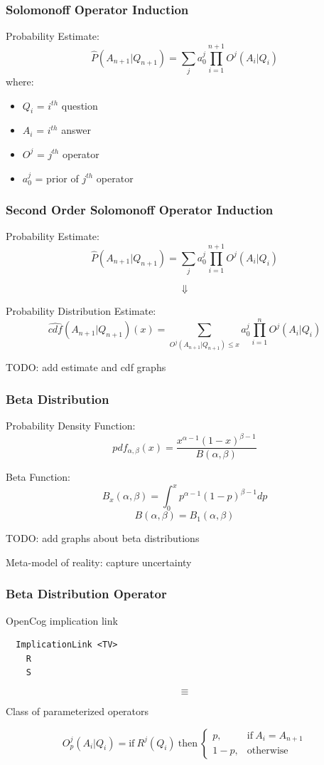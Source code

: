 \documentclass{beamer}
\begin{document}
\begin{frame}
  \frametitle{Solomonoff Operator Induction}

  Probability Estimate:
  $$
  \hat{P}(A_{n+1}|Q_{n+1}) = \sum_j a_0^j \prod_{i=1}^{n+1} O^j(A_i|Q_i)
  $$
  where:
  \begin{itemize}
  \item $Q_i$ = $i^{th}$ question
  \item $A_i$ = $i^{th}$ answer
  \item $O^j$ = $j^{th}$ operator
  \item $a^j_0$ = prior of $j^{th}$ operator
  \end{itemize}
\end{frame}

\begin{frame}
  \frametitle{Second Order Solomonoff Operator Induction}

  Probability Estimate:
  $$
  \hat{P}(A_{n+1}|Q_{n+1}) = \sum_j a_0^j \prod_{i=1}^{n+1} O^j(A_i|Q_i)
  $$

  $$
  \Downarrow
  $$
  
  Probability Distribution Estimate:
  $$
    \hat{cdf}(A_{n+1}|Q_{n+1})(x) = \sum_{O^j(A_{n+1}|Q_{n+1}) \le x}
    a_0^j \prod_{i=1}^{n} O^j(A_i|Q_i)
  $$

  TODO: add estimate and cdf graphs
\end{frame}

\begin{frame}
  \frametitle{Beta Distribution}

  Probability Density Function:
  $$
    pdf_{\alpha, \beta}(x) = \frac{x^{\alpha - 1} (1-x)^{\beta - 1}}
    {B(\alpha, \beta)}
  $$

  Beta Function:
  $$
  B_x(\alpha, \beta) = \int_0^x p^{\alpha - 1}(1-p)^{\beta - 1} dp
  $$
  $$
  B(\alpha, \beta) = B_1(\alpha, \beta)
  $$

  TODO: add graphs about beta distributions

  Meta-model of reality: \alert{capture uncertainty}
\end{frame}

\begin{frame}[fragile]
  \frametitle{Beta Distribution Operator}

OpenCog implication link
{\small
\begin{verbatim}
  ImplicationLink <TV>
    R
    S
\end{verbatim}
}

$$
\equiv
$$

Class of parameterized operators

  $$
  O^j_p(A_i|Q_i) = \text{if}\ R^j(Q_i)\ \text{then}\
  \begin{cases}
    p, & \text{if}\ A_i = A_{n+1}\\
    1-p, & \text{otherwise}
  \end{cases}
  $$
\end{frame}
\end{document}
